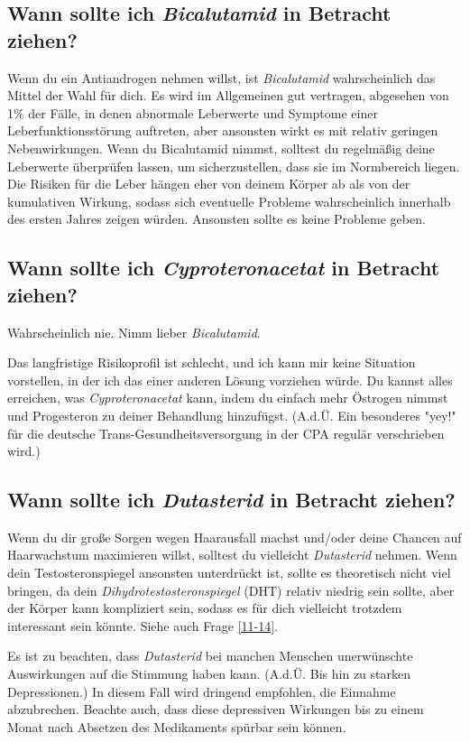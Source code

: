 \documentclass{article}
\begin{document}
{{{\subsection{Wann sollte ich \textit{Bicalutamid} in Betracht ziehen?}

Wenn du ein Antiandrogen nehmen willst, ist \textit{Bicalutamid} wahrscheinlich das Mittel der Wahl für dich. Es wird im Allgemeinen gut vertragen, abgesehen von 1\% der Fälle, in denen abnormale Leberwerte und Symptome einer Leberfunktionsstörung auftreten, aber ansonsten wirkt es mit relativ geringen Nebenwirkungen. Wenn du Bicalutamid nimmst, solltest du regelmäßig deine Leberwerte überprüfen lassen, um sicherzustellen, dass sie im Normbereich liegen. Die Risiken für die Leber hängen eher von deinem Körper ab als von der kumulativen Wirkung, sodass sich eventuelle Probleme wahrscheinlich innerhalb des ersten Jahres zeigen würden. Ansonsten sollte es keine Probleme geben.

\subsection{Wann sollte ich \textit{Cyproteronacetat} in Betracht ziehen?}

Wahrscheinlich nie. Nimm lieber \textit{Bicalutamid}.

Das langfristige Risikoprofil ist schlecht, und ich kann mir keine Situation vorstellen, in der ich das einer anderen Lösung vorziehen würde. Du kannst alles erreichen, was \textit{Cyproteronacetat} kann, indem du einfach mehr Östrogen nimmst und Progesteron zu deiner Behandlung hinzufügst. (A.d.Ü. Ein besonderes "yey!" für die deutsche Trans-Gesundheitsversorgung in der CPA regulär verschrieben wird.)

\subsection{Wann sollte ich \textit{Dutasterid} in Betracht ziehen?}

Wenn du dir große Sorgen wegen Haarausfall machst und/oder deine Chancen auf Haarwachstum maximieren willst, solltest du vielleicht \textit{Dutasterid} nehmen. Wenn dein Testosteronspiegel ansonsten unterdrückt ist, sollte es theoretisch nicht viel bringen, da dein \textit{Dihydrotestosteronspiegel} (DHT) relativ niedrig sein sollte, aber der Körper kann kompliziert sein, sodass es für dich vielleicht trotzdem interessant sein könnte. Siehe auch Frage \ref{11-14}.

Es ist zu beachten, dass \textit{Dutasterid} bei manchen Menschen unerwünschte Auswirkungen auf die Stimmung haben kann. (A.d.Ü. Bis hin zu starken Depressionen.) In diesem Fall wird dringend empfohlen, die Einnahme abzubrechen. Beachte auch, dass diese depressiven Wirkungen bis zu einem Monat nach Absetzen des Medikaments spürbar sein können.

}}}
\end{document}
